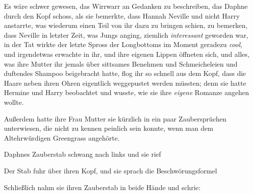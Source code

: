 Es wäre schwer gewesen, das Wirrwarr an Gedanken zu beschreiben, das Daphne durch den Kopf schoss, als sie bemerkte, dass Hannah Neville und nicht Harry anstarrte, was wiederum einen Teil von ihr dazu zu bringen schien, zu bemerken, dass Neville in letzter Zeit, was Jungs anging, ziemlich \emph{interessant} geworden war, in der Tat wirkte der letzte Spross der Longbottoms im Moment geradezu \emph{cool}, und irgendetwas erwachte in ihr, und ihre eigenen Lippen öffneten sich, und alles, was ihre Mutter ihr jemals über sittsames Benehmen und Schmeicheleien und duftendes Shampoo beigebracht hatte, flog ihr so schnell aus dem Kopf, dass die Haare neben ihren Ohren eigentlich weggepustet werden müssten; denn sie hatte Hermine und Harry beobachtet und wusste, wie sie ihre \emph{eigene} Romanze angehen wollte.

Außerdem hatte ihre Frau Mutter sie kürzlich in ein paar Zaubersprüchen unterwiesen, die nicht zu kennen peinlich sein konnte, wenn man dem Altehrwürdigen Greengrass angehörte.

Daphnes Zauberstab schwang nach links und sie rief 

Der Stab fuhr über ihren Kopf, und sie sprach die Beschwörungsformel 

Schließlich nahm sie ihren Zauberstab in beide Hände und schrie: 


